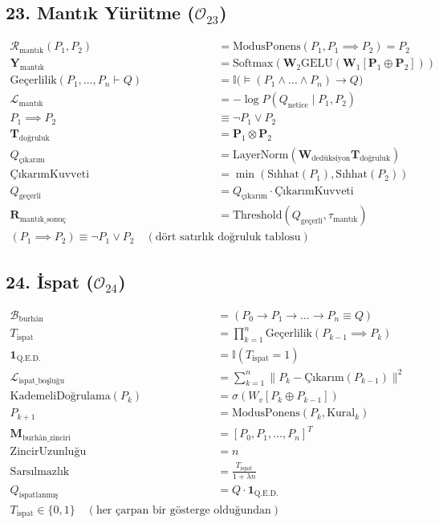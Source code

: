 \documentclass[11pt, a4paper]{article}
\begin{document}
\subsection{23. Mantık Yürütme ($\mathcal{O}_{23}$)}
\begin{align}
\mathcal{R}_{\text{mantık}}(P_1, P_2) &= \text{ModusPonens}(P_1, P_1 \implies P_2) = P_2 \\
\mathbf{Y}_{\text{mantık}} &= \text{Softmax}\left( \mathbf{W}_2 \text{GELU}(\mathbf{W}_1 [\mathbf{P}_1 \oplus \mathbf{P}_2]) \right) \\
\text{Geçerlilik}(P_1, \dots, P_n \vdash Q) &= \mathbb{I}\big( \models (P_1 \land \dots \land P_n) \to Q \big) \\
\mathcal{L}_{\text{mantık}} &= -\log P(Q_{\text{netice}} \mid P_1, P_2) \\
P_1 \implies P_2 &\equiv \neg P_1 \lor P_2 \\
\mathbf{T}_{\text{doğruluk}} &= \mathbf{P}_1 \otimes \mathbf{P}_2 \\
Q_{\text{çıkarım}} &= \text{LayerNorm}(\mathbf{W}_{\text{dedüksiyon}} \mathbf{T}_{\text{doğruluk}}) \\
\text{ÇıkarımKuvveti} &= \min(\text{Sıhhat}(P_1), \text{Sıhhat}(P_2)) \\
Q_{\text{geçerli}} &= Q_{\text{çıkarım}} \cdot \text{ÇıkarımKuvveti} \\
\mathbf{R}_{\text{mantık\_sonuç}} &= \text{Threshold}(Q_{\text{geçerli}}, \tau_{\text{mantık}}) \\
(P_1 \implies P_2) \equiv \neg P_1 \lor P_2 \quad (\text{dört satırlık doğruluk tablosu})
\end{align}

\subsection{24. İspat ($\mathcal{O}_{24}$)}
\begin{align}
\mathcal{B}_{\text{burhân}} &= (P_0 \to P_1 \to \dots \to P_n \equiv Q) \\
T_{\text{ispat}} &= \prod_{k=1}^n \text{Geçerlilik}(P_{k-1} \implies P_k) \\
\mathbf{1}_{\text{Q.E.D.}} &= \mathbb{I}(T_{\text{ispat}} = 1) \\
\mathcal{L}_{\text{ispat\_boşluğu}} &= \sum_{k=1}^n \| P_k - \text{Çıkarım}(P_{k-1}) \|^2 \\
\text{KademeliDoğrulama}(P_k) &= \sigma(W_v [P_k \oplus P_{k-1}]) \\
P_{k+1} &= \text{ModusPonens}(P_k, \text{Kural}_k) \\
\mathbf{M}_{\text{burhân\_zinciri}} &= [P_0, P_1, \dots, P_n]^T \\
\text{ZincirUzunluğu} &= n \\
\text{Sarsılmazlık} &= \frac{T_{\text{ispat}}}{1 + \lambda n} \\
Q_{\text{ispatlanmış}} &= Q \cdot \mathbf{1}_{\text{Q.E.D.}} \\
T_{\text{ispat}} \in \{0, 1\} \quad (\text{her çarpan bir gösterge olduğundan})
\end{align}
\end{document}
